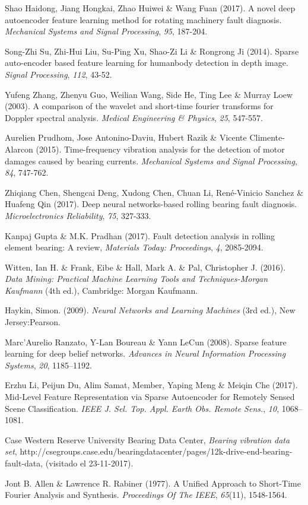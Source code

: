 \documentclass[12pt]{article}
\begin{document}
\begin{thebibliography}{9}
 Shao Haidong, Jiang Hongkai, Zhao Huiwei \& Wang Fuan (2017). A novel deep autoencoder feature learning method for rotating machinery fault diagnosis. \textit{Mechanical Systems and Signal Processing}, \textit{95}, 187-204. 

 Song-Zhi Su, Zhi-Hui Liu, Su-Ping Xu, Shao-Zi Li \& Rongrong Ji (2014). Sparse auto-encoder based feature learning for humanbody detection in depth image. \textit{Signal Processing}, \textit{112}, 43-52.

 Yufeng Zhang, Zhenyu Guo, Weilian Wang, Side He, Ting Lee \& Murray Loew (2003). A comparison of the wavelet and short-time fourier transforms for Doppler spectral analysis. \textit{Medical Engineering \& Physics}, \textit{25}, 547-557.

 Aurelien Prudhom, Jose Antonino-Daviu, Hubert Razik \& Vicente Climente-Alarcon (2015). Time-frequency vibration analysis for the detection of motor damages caused by bearing currents. \textit{Mechanical Systems and Signal Processing}, \textit{84}, 747-762.

 Zhiqiang Chen, Shengcai Deng, Xudong Chen, Chuan Li, René-Vinicio Sanchez \& Huafeng Qin (2017). Deep neural networks-based rolling bearing fault diagnosis. \textit{Microelectronics Reliability}, \textit{75}, 327-333.

 Kanpaj Gupta \& M.K. Pradhan (2017). Fault detection analysis in rolling element bearing: A review, \textit{Materials Today: Proceedings}, \textit{4}, 2085-2094.

 Witten, Ian H. \& Frank, Eibe \& Hall, Mark A. \& Pal, Christopher J. (2016). \textit{Data Mining: Practical Machine Learning Tools and Techniques-Morgan Kaufmann} (4th ed.), Cambridge: Morgan Kaufmann.

 Haykin, Simon. (2009). \textit{Neural Networks and Learning Machines} (3rd ed.), New Jersey:Pearson.

 Marc’Aurelio Ranzato, Y-Lan Boureau \& Yann LeCun (2008). Sparse feature learning for deep belief networks. \textit{Advances in Neural Information Processing Systems}, \textit{20}, 1185–1192.

 Erzhu Li, Peijun Du, Alim Samat, Member, Yaping Meng \& Meiqin Che (2017). Mid-Level Feature Representation via Sparse Autoencoder for Remotely Sensed Scene Classification. \textit{IEEE J. Sel. Top. Appl. Earth Obs. Remote Sens.}, \textit{10}, 1068–1081.

 Case Western Reserve University Bearing Data Center, \textit{Bearing vibration data set}, http://csegroups.case.edu/bearingdatacenter/pages/12k-drive-end-bearing-fault-data, (visitado el 23-11-2017).

 Jont B. Allen \& Lawrence R. Rabiner (1977). A Unified Approach to Short-Time Fourier Analysis
and Synthesis. \textit{Proceedings Of The IEEE}, \textit{65}(11), 1548-1564.

\end{thebibliography}
\end{document}
